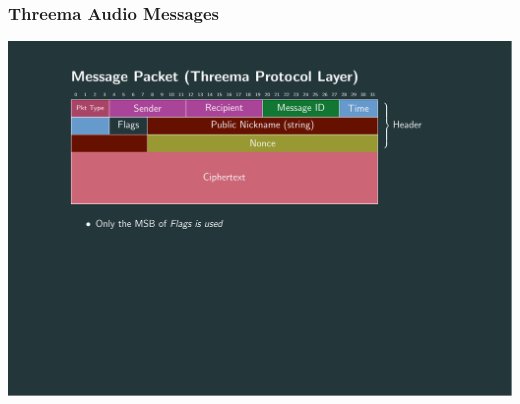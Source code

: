 \documentclass[10pt]{beamer}
\begin{document}
\begin{frame}
	\frametitle{Threema Audio Messages}
	\includegraphics[page=5,clip,trim={2.6cm 7.5cm 3.2cm 1cm},width=\textwidth]{out/messages.pdf}
\end{frame}
\end{document}
